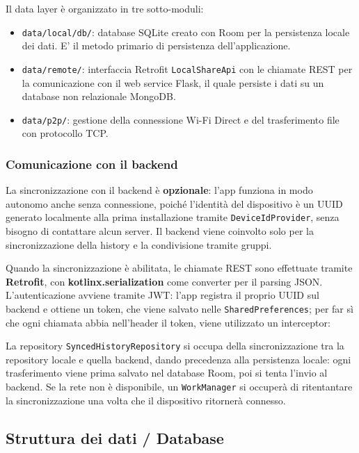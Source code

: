 Il data layer è organizzato in tre sotto-moduli:

\begin{itemize}[label={--}, leftmargin=1.2cm]
    \item \texttt{data/local/db/}: database SQLite creato con Room per la persistenza locale dei dati. E' il metodo primario di persistenza dell'applicazione. 
    \item \texttt{data/remote/}: interfaccia Retrofit \texttt{LocalShareApi} con le chiamate REST per la comunicazione con il web service Flask, il quale persiste i dati su un database non relazionale MongoDB. 
    \item \texttt{data/p2p/}: gestione della connessione Wi-Fi Direct e del trasferimento file con protocollo TCP.
\end{itemize}

\subsubsection*{Comunicazione con il backend}

La sincronizzazione con il backend è \textbf{opzionale}: l'app funziona in modo autonomo anche senza connessione, poiché l'identità del dispositivo è un UUID generato localmente alla prima installazione tramite \texttt{DeviceIdProvider}, senza bisogno di contattare alcun server. Il backend viene coinvolto solo per la sincronizzazione della history e la condivisione tramite gruppi.

Quando la sincronizzazione è abilitata, le chiamate REST sono effettuate tramite \textbf{Retrofit}, con \textbf{kotlinx.serialization} come converter per il parsing JSON.
L'autenticazione avviene tramite JWT: l'app registra il proprio UUID sul backend e ottiene un token, che viene salvato nelle \texttt{Shared\-Preferences}; per far sì che ogni chiamata abbia nell'header il token, viene utilizzato un interceptor:


La repository \texttt{SyncedHistoryRepository} si occupa della sincronizzazione tra la repository locale e quella backend, dando precedenza alla persistenza locale: ogni trasferimento viene prima salvato nel database Room, poi si tenta l'invio al backend. Se la rete non è disponibile, un \texttt{WorkManager} si occuperà di ritentantare la sincronizzazione una volta che il dispositivo ritornerà connesso.

\subsection{Struttura dei dati / Database}


